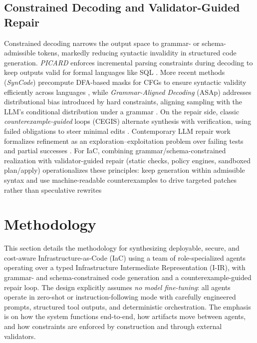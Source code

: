 \documentclass[manuscript,screen,nonacm]{acmart}
\begin{document}
\subsection{Constrained Decoding and Validator-Guided Repair}
Constrained decoding narrows the output space to grammar- or schema-admissible tokens, markedly reducing syntactic invalidity in structured code generation. \emph{PICARD} enforces incremental parsing constraints during decoding to keep outputs valid for formal languages like SQL \cite{scholak2021picard}. More recent methods (\emph{SynCode}) precompute DFA-based masks for CFGs to ensure syntactic validity efficiently across languages \cite{ugare2024syncode}, while \emph{Grammar-Aligned Decoding} (ASAp) addresses distributional bias introduced by hard constraints, aligning sampling with the LLM’s conditional distribution under a grammar \cite{park2024grammar}. On the repair side, classic \emph{counterexample-guided} loops (CEGIS) alternate synthesis with verification, using failed obligations to steer minimal edits \cite{solar2009sketching}. Contemporary LLM repair work formalizes refinement as an exploration–exploitation problem over failing tests and partial successes \cite{tang2024code}. For IaC, combining grammar/schema-constrained realization with validator-guided repair (static checks, policy engines, sandboxed plan/apply) operationalizes these principles: keep generation within admissible syntax and use machine-readable counterexamples to drive targeted patches rather than speculative rewrites





\section{Methodology}
\label{sec:method}

\noindent
This section details the methodology for synthesizing deployable, secure, and cost-aware Infrastructure-as-Code (IaC) using a team of role-specialized agents operating over a typed Infrastructure Intermediate Representation (I-IR), with grammar- and schema-constrained code generation and a counterexample-guided repair loop. The design explicitly assumes \emph{no model fine-tuning}: all agents operate in zero-shot or instruction-following mode with carefully engineered prompts, structured tool outputs, and deterministic orchestration. The emphasis is on how the system functions end-to-end, how artifacts move between agents, and how constraints are enforced by construction and through external validators.
\end{document}
